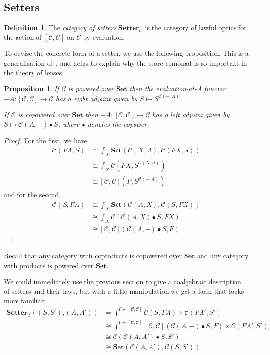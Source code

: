 \documentclass[11pt,letterpaper]{article}
\theoremstyle{plain}
\newtheorem{proposition}[theorem]{Proposition}
\theoremstyle{definition}
\newtheorem{definition}[theorem]{Definition}
\newcommand{\C}{\mathscr{C}}
\newcommand{\Set}{\mathbf{Set}}
\newcommand{\Setter}{\mathbf{Setter}}
\begin{document}
\subsection{Setters}\label{sec:setters}

\begin{definition}
  The \emph{category of setters} $\Setter_\C$ is the category of lawful optics for the action of $[\C, \C]$ on $\C$ by evaluation.
\end{definition}

To devise the concrete form of a setter, we use the following proposition. This is a generalisation of~\cite[Proposition 2.2]{SecondOrderFunctionals}, and helps to explain why the store comonad is so important in the theory of lenses.

\begin{proposition}
If $\C$ is powered over $\Set$ then the evaluation-at-$A$ functor $-A : [\C, \C] \to \C$ has a right adjoint given by $S \mapsto S^{\C(-, A)}$.

If $\C$ is copowered over $\Set$ then $-A : [\C, \C] \to \C$ has a left adjoint given by $S \mapsto \C(A, -) \bullet S$, where $\bullet$ denotes the copower.
\end{proposition}
\begin{proof}
For the first, we have
\begin{align*}
\C(FA, S)
&\cong \int_X \Set(\C(X, A), \C(FX, S)) \\
&\cong \int_X \C(FX, S^{\C(X, A)}) \\
&\cong [\C, \C](F, S^{\C(-, A)})
\end{align*}
and for the second,
\begin{align*}
\C(S, FA)
&\cong \int_X \Set(\C(A, X), \C(S, FX)) \\
&\cong \int_X \C(\C(A, X) \bullet S, FX) \\
&\cong [\C, \C](\C(A, -) \bullet S, F)
\end{align*}
\end{proof}

Recall that any category with coproducts is copowered over $\Set$ and any category with products is powered over $\Set$.

We could immediately use the previous section to give a coalgebraic description of setters and their laws, but with a little manipulation we get a form that looks more familiar:
\begin{align*}
  \Setter_\C((S, S'), (A, A')) &= \int^{F \in [\C, \C]} \C(S, FA) \times \C(FA', S') \\
                               &\cong \int^{F \in [\C, \C]} [\C, \C](\C(A, -) \bullet S, F) \times \C(FA', S') \\
                               &\cong \C(\C(A, A') \bullet S, S') \\
                               &\cong \Set(\C(A, A'), \C(S, S'))
\end{align*}
\end{document}
